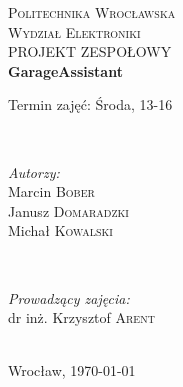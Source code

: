 \begin{titlepage}
	\center
	
	
	
	\textsc{\Large Politechnika Wrocławska}\\[0.5cm] %
	\textsc{\large Wydział Elektroniki}\\[5cm] %
	
	
	\textsc{\LARGE PROJEKT ZESPOŁOWY}\\[2cm] %
	{ \Large \bfseries GarageAssistant}\\[4cm] %
	\begin{minipage}{0.83\textwidth}
	\begin{flushleft} \large
	Termin zajęć: Środa, 13-16 \\[2cm]
	\end{flushleft}
	\end{minipage}
	\\[2cm]
	
	
	\begin{minipage}{0.4\textwidth}
	\begin{flushleft} \large
	\emph{Autorzy:}\\
	Marcin \textsc{Bober}\\
	Janusz \textsc{Domaradzki}\\
	Michał \textsc{Kowalski}\\
	\end{flushleft}
	\end{minipage}
	~
	\begin{minipage}{0.4\textwidth}
	\begin{flushright} \large
	\emph{Prowadzący zajęcia:} \\
	dr inż. Krzysztof \textsc{Arent} 
	\end{flushright}
	\end{minipage}\\[1cm]
	
	
	{\large Wrocław, \today}\\[1cm]
	
	\vfill 
	\end{titlepage}